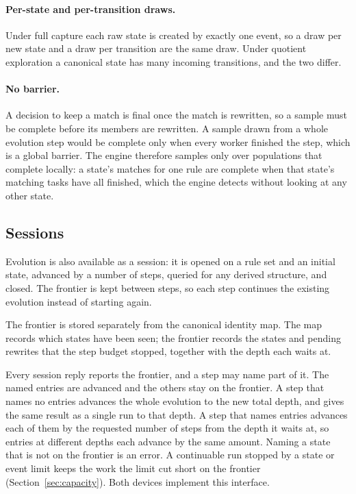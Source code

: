 \paragraph{Per-state and per-transition draws.}
Under full capture each raw state is created by exactly one event, so a draw per new state and a
draw per transition are the same draw. Under quotient exploration a canonical state has many
incoming transitions, and the two differ.

\paragraph{No barrier.}
A decision to keep a match is final once the match is rewritten, so a sample must be complete
before its members are rewritten. A sample drawn from a whole evolution step would be complete only
when every worker finished the step, which is a global barrier. The engine therefore samples only
over populations that complete locally: a state's matches for one rule are complete when that
state's matching tasks have all finished, which the engine detects without looking at any other
state.

\subsection{Sessions}
\label{sec:sessions}

Evolution is also available as a session: it is opened on a rule set and an initial state, advanced
by a number of steps, queried for any derived structure, and closed. The frontier is kept between
steps, so each step continues the existing evolution instead of starting again.

The frontier is stored separately from the canonical identity map. The map records which states
have been seen; the frontier records the states and pending rewrites that the step budget stopped,
together with the depth each waits at.

Every session reply reports the frontier, and a step may name part of it. The named entries are
advanced and the others stay on the frontier. A step that names no entries advances the whole
evolution to the new total depth, and gives the same result as a single run to that depth. A step
that names entries advances each of them by the requested number of steps from the depth it waits
at, so entries at different depths each advance by the same amount. Naming a state that is not on
the frontier is an error. A continuable run stopped by a state or event limit keeps the work the
limit cut short on the frontier (Section~\ref{sec:capacity}). Both devices implement this interface.

